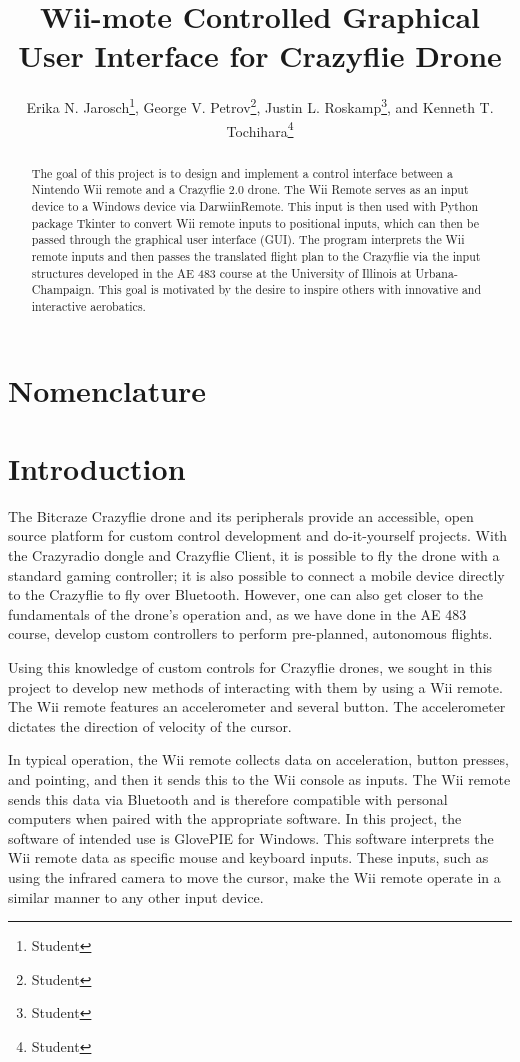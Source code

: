 \documentclass[conf]{new-aiaa}
\title{Wii-mote Controlled Graphical User Interface for Crazyflie Drone}
\author{Erika N. Jarosch\footnote{Student}, George V. Petrov\footnote{Student}, Justin L. Roskamp\footnote{Student}, and Kenneth T. Tochihara\footnote{Student}}
\affil{University of Illinois at Urbana-Champaign, Urbana, IL, 61820}
\begin{document}
\maketitle

\begin{abstract} 
    The goal of this project is to design and implement a control interface between a Nintendo Wii remote and a Crazyflie 2.0 drone. The Wii Remote serves as an input device to a Windows device via DarwiinRemote. This input is then used with Python package Tkinter to convert Wii remote inputs to positional inputs, which can then be passed through the graphical user interface (GUI). The program interprets the Wii remote inputs and then passes the translated flight plan to the Crazyflie via the input structures developed in the AE 483 course at the University of Illinois at Urbana-Champaign. This goal is motivated by the desire to inspire others with innovative and interactive aerobatics.

\end{abstract}

\section{Nomenclature}

\section{Introduction}

    The Bitcraze Crazyflie drone and its peripherals provide an accessible, open source platform for custom control development and do-it-yourself projects. \cite{cfclient} With the Crazyradio dongle and Crazyflie Client, it is possible to fly the drone with a standard gaming controller; it is also possible to connect a mobile device directly to the Crazyflie to fly over Bluetooth. However, one can also get closer to the fundamentals of the drone's operation and, as we have done in the AE 483 course, develop custom controllers to perform pre-planned, autonomous flights.
    
    Using this knowledge of custom controls for Crazyflie drones, we sought in this project to develop new methods of interacting with them by using a Wii remote. \cite{darwiin} The Wii remote features an accelerometer and several button. The accelerometer dictates the direction of velocity of the cursor. 
    
    In typical operation, the Wii remote collects data on acceleration, button presses, and pointing, and then it sends this to the Wii console as inputs. The Wii remote sends this data via Bluetooth and is therefore compatible with personal computers when paired with the appropriate software. In this project, the software of intended use is GlovePIE for Windows. This software interprets the Wii remote data as specific mouse and keyboard inputs. These inputs, such as using the infrared camera to move the cursor, make the Wii remote operate in a similar manner to any other input device.
    
\end{document}
